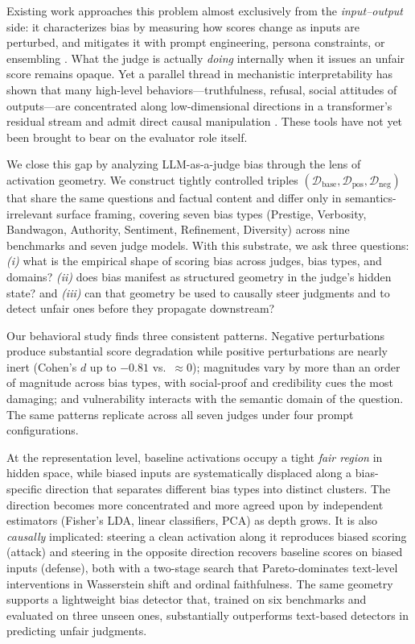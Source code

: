 \documentclass[11pt]{article}
\begin{document}
Existing work approaches this problem almost exclusively from the \emph{input--output} side: it characterizes bias by measuring how scores change as inputs are perturbed, and mitigates it with prompt engineering, persona constraints, or ensembling \citep{dubois2024length,wataoka2024self,verga2024replacing}. What the judge is actually \emph{doing} internally when it issues an unfair score remains opaque. Yet a parallel thread in mechanistic interpretability has shown that many high-level behaviors---truthfulness, refusal, social attitudes of outputs---are concentrated along low-dimensional directions in a transformer's residual stream and admit direct causal manipulation \citep{turner2023activation,li2023inference,zou2023representation,arditi2024refusal,park2024linear,siddique2025shifting}. These tools have not yet been brought to bear on the evaluator role itself.

We close this gap by analyzing LLM-as-a-judge bias through the lens of activation geometry. We construct tightly controlled triples $(\mathcal{D}_{\text{base}}, \mathcal{D}_{\text{pos}}, \mathcal{D}_{\text{neg}})$ that share the same questions and factual content and differ only in semantics-irrelevant surface framing, covering seven bias types (Prestige, Verbosity, Bandwagon, Authority, Sentiment, Refinement, Diversity) across nine benchmarks and seven judge models. With this substrate, we ask three questions: \emph{(i)} what is the empirical shape of scoring bias across judges, bias types, and domains? \emph{(ii)} does bias manifest as structured geometry in the judge's hidden state? and \emph{(iii)} can that geometry be used to causally steer judgments and to detect unfair ones before they propagate downstream?

Our behavioral study finds three consistent patterns. Negative perturbations produce substantial score degradation while positive perturbations are nearly inert (Cohen's $d$ up to $-0.81$ vs.\ ${\approx}0$); magnitudes vary by more than an order of magnitude across bias types, with social-proof and credibility cues the most damaging; and vulnerability interacts with the semantic domain of the question. The same patterns replicate across all seven judges under four prompt configurations.

At the representation level, baseline activations occupy a tight \emph{fair region} in hidden space, while biased inputs are systematically displaced along a bias-specific direction that separates different bias types into distinct clusters. The direction becomes more concentrated and more agreed upon by independent estimators (Fisher's LDA, linear classifiers, PCA) as depth grows. It is also \emph{causally} implicated: steering a clean activation along it reproduces biased scoring (attack) and steering in the opposite direction recovers baseline scores on biased inputs (defense), both with a two-stage search that Pareto-dominates text-level interventions in Wasserstein shift and ordinal faithfulness. The same geometry supports a lightweight bias detector that, trained on six benchmarks and evaluated on three unseen ones, substantially outperforms text-based detectors in predicting unfair judgments.
\end{document}
